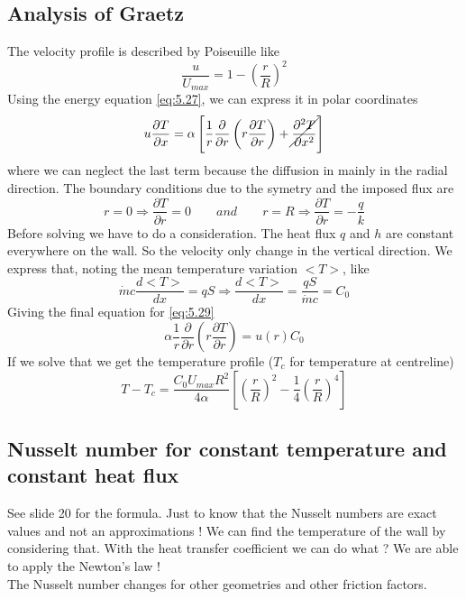 	\subsection{Analysis of Graetz}
		The velocity profile is described by Poiseuille like 
		\begin{equation}
			\frac{u}{U_{max}} = 1 - \left( \frac{r}{R} \right)^2
		\end{equation}
		Using the energy equation \autoref{eq:5.27}, we can express it in polar coordinates 
		\begin{equation}
			u \frac{\partial T}{\partial x} = \alpha \left[ \frac{1}{r}\frac{\partial }{\partial r} \left( r\frac{\partial T}{\partial r}\right) + \cancel{\frac{\partial ^2 T}{\partial x^2}} \right]
			\label{eq:5.29}
		\end{equation}
		where we can neglect the last term because the diffusion in mainly in the radial direction. The boundary conditions due to the symetry and the imposed flux are 
		\begin{equation}
			r = 0 \Rightarrow \frac{\partial T}{\partial r} = 0 \qquad and \qquad
			r = R \Rightarrow \frac{\partial T}{\partial r} = -\frac{q}{k}
		\end{equation}
		Before solving we have to do a consideration. The heat flux $q$ and $h$ are constant everywhere on the wall. So the velocity only change in the vertical direction. We express that, noting the mean temperature variation $<T>$, like 
		\begin{equation}
			\dot{m}c \frac{d <T>}{dx} = qS \Rightarrow \frac{d <T>}{dx} = \frac{qS}{\dot{m}c} = C_0
		\end{equation}
		Giving the final equation for \autoref{eq:5.29}
		\begin{equation}
			\alpha \frac{1}{r}\frac{\partial }{\partial r} \left( r\frac{\partial T}{\partial r}\right) = u(r) C_0
		\end{equation}
		If we solve that we get the temperature profile ($T_c$ for temperature at centreline)
		\begin{equation}
			T-T_c = \frac{C_0 U_{max}R^2}{4\alpha} \left[ \left( \frac{r}{R} \right)^2 - \frac{1}{4}\left( \frac{r}{R} \right)^4 \right]
		\end{equation}
	
	\subsection{Nusselt number for constant temperature and constant heat flux}
		See slide 20 for the formula. Just to know that the Nusselt numbers are exact values and not an approximations !  We can find the temperature of the wall by considering that. With the heat transfer coefficient we can do what ? We are able to apply the Newton’s law ! \\
		The Nusselt number changes for other geometries and other friction factors. 
		
